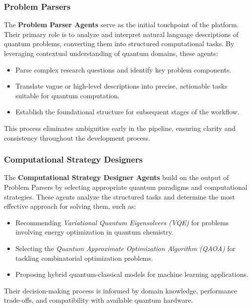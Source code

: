 \documentclass[12pt]{article}
\begin{document}
\subsubsection{Problem Parsers}
The \textbf{Problem Parser Agents} serve as the initial touchpoint of the platform. Their primary role is to analyze and interpret natural language descriptions of quantum problems, converting them into structured computational tasks. By leveraging contextual understanding of quantum domains, these agents:
\begin{itemize}
    \item Parse complex research questions and identify key problem components.
    \item Translate vague or high-level descriptions into precise, actionable tasks suitable for quantum computation.
    \item Establish the foundational structure for subsequent stages of the workflow.
\end{itemize}
This process eliminates ambiguities early in the pipeline, ensuring clarity and consistency throughout the development process.

\subsubsection{Computational Strategy Designers}
The \textbf{Computational Strategy Designer Agents} build on the output of Problem Parsers by selecting appropriate quantum paradigms and computational strategies. These agents analyze the structured tasks and determine the most effective approach for solving them, such as:
\begin{itemize}
    \item Recommending \textit{Variational Quantum Eigensolvers (VQE)} for problems involving energy optimization in quantum chemistry.
    \item Selecting the \textit{Quantum Approximate Optimization Algorithm (QAOA)} for tackling combinatorial optimization problems.
    \item Proposing hybrid quantum-classical models for machine learning applications.
\end{itemize}
Their decision-making process is informed by domain knowledge, performance trade-offs, and compatibility with available quantum hardware.
\end{document}

